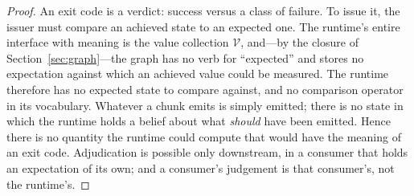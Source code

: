 \documentclass[11pt,a4paper,twocolumn]{article}
\theoremstyle{definition}
\newcommand{\Vals}{\mathcal{V}}
\begin{document}
\begin{proof}
An exit code is a verdict: success versus a class of failure. To issue it, the
issuer must compare an achieved state to an expected one. The runtime's entire
interface with meaning is the value collection $\Vals$, and---by the closure of
Section~\ref{sec:graph}---the graph has no verb for ``expected'' and stores no
expectation against which an achieved value could be measured. The runtime
therefore has no expected state to compare against, and no comparison operator
in its vocabulary. Whatever a chunk emits is simply emitted; there is no state
in which the runtime holds a belief about what \emph{should} have been emitted.
Hence there is no quantity the runtime could compute that would have the meaning
of an exit code. Adjudication is possible only downstream, in a consumer that
holds an expectation of its own; and a consumer's judgement is that consumer's,
not the runtime's.
\end{proof}
\end{document}
